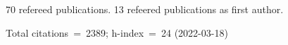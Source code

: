 70 refereed publications. 13 refeered publications as first author.

Total citations~=~2389; h-index~=~24 (2022-03-18)